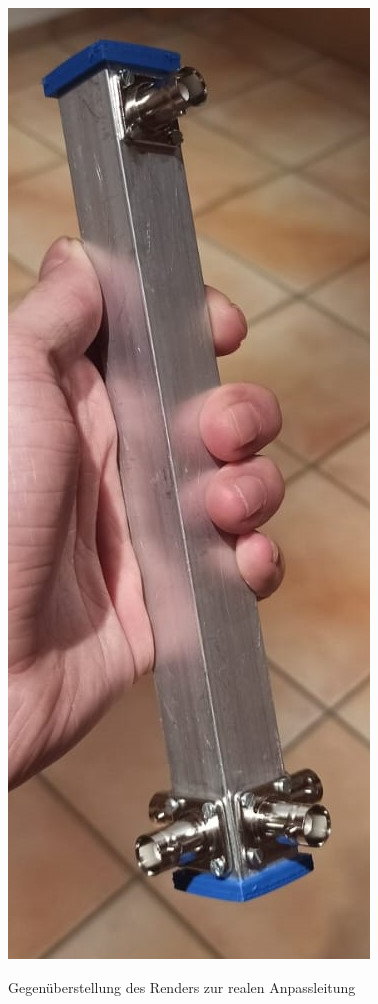 \begin{figure}[H]
\begin{minipage}[b]{.2\linewidth}
		\label{fig:Anpassleitung-Render}
	\end{minipage}
	\hspace{.1\linewidth}%
	\begin{minipage}[b]{.2\linewidth} %
		\includegraphics[width=\linewidth]{../ref/Anpasstopf-real.jpeg}
		\label{fig:Anpassleitung-real}
	\end{minipage}
	\caption{Gegenüberstellung des Renders zur realen Anpassleitung}
\end{figure}

